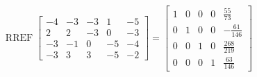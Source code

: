 \begin{exerciseAnswer} 


\[\operatorname{RREF} \left[\begin{array}{ccccc}
-4 & -3 & -3 & 1 & -5 \\
2 & 2 & -3 & 0 & -3 \\
-3 & -1 & 0 & -5 & -4 \\
-3 & 3 & 3 & -5 & -2
\end{array}\right] = \left[\begin{array}{ccccc}
1 & 0 & 0 & 0 & \frac{55}{73} \\
0 & 1 & 0 & 0 & -\frac{61}{146} \\
0 & 0 & 1 & 0 & \frac{268}{219} \\
0 & 0 & 0 & 1 & \frac{63}{146}
\end{array}\right] \]



\end{exerciseAnswer}

